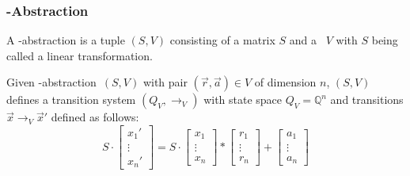 \begin{frame}[t]
	\frametitle{\qvasr-Abstraction}
	\newcommand{\s}{\ensuremath{\begin{bmatrix} s_x & s_y & s_z \end{bmatrix}}}
	\newcommand{\p}{\ensuremath{\begin{bmatrix} x' \\ y' \\ z' \end{bmatrix}}}
	\newcommand{\up}{\ensuremath{\begin{bmatrix} x \\ y \\ z \end{bmatrix}}}
	\begin{definition}
		A \qvasr-abstraction is a tuple $(S, V)$ consisting of a matrix $S$ and a \qvasr\ $V$ with $S$ being called a linear transformation.
	\end{definition}
	\begin{center}
		\onslide<+->
		Given \qvasr-abstraction\ $(S, V)$ with pair $(\vec{r}, \vec{a}) \in V$ of dimension $n$, $(S, V)$ defines a transition system $(Q_V, \rightarrow_V)$ with state space $Q_V =  \mathbb{Q}^n$  and transitions $\vec{x} \rightarrow_V \vec{x}'$ defined as follows: \\
		\begin{equation}
		S \cdot
		\begin{bmatrix}
			x_1' \\
			\vdots \\
			x_n'
		\end{bmatrix}
		=
		S \cdot
		\begin{bmatrix}
			x_1 \\
			\vdots \\
			x_n
		\end{bmatrix}
		*
			\begin{bmatrix}
				r_1 \\
				\vdots \\
				r_n
			\end{bmatrix}
		+
		\begin{bmatrix}
			a_1 \\
			\vdots \\
			a_n
		\end{bmatrix}
		\end{equation}	
	\end{center}
\end{frame}


